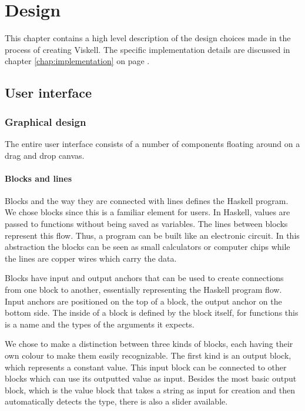 \chapter{Design}

This chapter contains a high level description of the design choices made in the process of creating Viskell.
The specific implementation details are discussed in chapter \ref{chap:implementation} on page \pageref{chap:implementation}.

\section{User interface}

\subsection{Graphical design}

The entire user interface consists of a number of components floating around on a drag and drop canvas.

\subsubsection{Blocks and lines}
Blocks and the way they are connected with lines defines the Haskell program. We chose blocks since this is a familiar element for users. In Haskell, values are passed to functions without being saved as variables. The lines between blocks represent this flow. Thus, a program can be built like an electronic circuit. In this abstraction the blocks can be seen as small calculators or computer chips while the lines are copper wires which carry the data.

Blocks have input and output anchors that can be used to create connections from one block to another, essentially representing the Haskell program flow. Input anchors are positioned on the top of a block, the output anchor on the bottom side. The inside of a block is defined by the block itself, for functions this is a name and the types of the arguments it expects.

We chose to make a distinction between three kinds of blocks, each having their own colour to make them easily recognizable.
The first kind is an output block, which represents a constant value.  
This input block can be connected to other blocks which can use its outputted value as input.
Besides the most basic output block, which is the value block that takes a string as input for creation and then automatically detects the type, there is also a slider available. 

